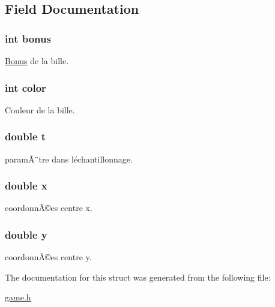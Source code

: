 \subsection{Field Documentation}
\subsubsection[{\texorpdfstring{bonus}{bonus}}]{\setlength{\rightskip}{0pt plus 5cm}int bonus}\hypertarget{struct_marble_a21a6e1305c3f396d42ee151e8751b469}{}\label{struct_marble_a21a6e1305c3f396d42ee151e8751b469}
\hyperlink{struct_bonus}{Bonus} de la bille. 
\subsubsection[{\texorpdfstring{color}{color}}]{\setlength{\rightskip}{0pt plus 5cm}int color}\hypertarget{struct_marble_a0fd02fb9277ffcb35a75066ffe95e8c7}{}\label{struct_marble_a0fd02fb9277ffcb35a75066ffe95e8c7}
Couleur de la bille. 
\subsubsection[{\texorpdfstring{t}{t}}]{\setlength{\rightskip}{0pt plus 5cm}double t}\hypertarget{struct_marble_a87accd1af8e0aff4b818d891374f7cec}{}\label{struct_marble_a87accd1af8e0aff4b818d891374f7cec}
paramÃ¨tre dans l\textquotesingle{}échantillonnage. 
\subsubsection[{\texorpdfstring{x}{x}}]{\setlength{\rightskip}{0pt plus 5cm}double x}\hypertarget{struct_marble_af88b946fb90d5f08b5fb740c70e98c10}{}\label{struct_marble_af88b946fb90d5f08b5fb740c70e98c10}
coordonnÃ©es centre x. 
\subsubsection[{\texorpdfstring{y}{y}}]{\setlength{\rightskip}{0pt plus 5cm}double y}\hypertarget{struct_marble_ab927965981178aa1fba979a37168db2a}{}\label{struct_marble_ab927965981178aa1fba979a37168db2a}
coordonnÃ©es centre y. 

The documentation for this struct was generated from the following file\+:\begin{DoxyCompactItemize}
\item 
\hyperlink{game_8h}{game.\+h}\end{DoxyCompactItemize}
